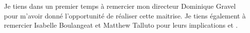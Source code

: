 

\Pagetitre
\cleardoublepage






\remerciements


Je tiens dans un premier temps à remercier mon directeur Dominique Gravel pour m'avoir donné l'opportunité de réaliser cette maitrise. Je tiens également à remercier Isabelle Boulangeat et Matthew Talluto pour leurs implications et .


\avantpropos


